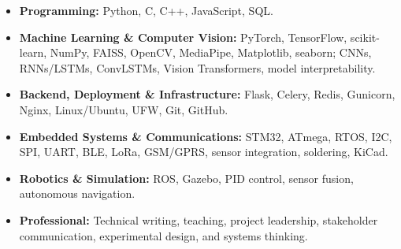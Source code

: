 \begin{itemize}
    \item \textbf{Programming:} Python, C, C++, JavaScript, SQL.
    \item \textbf{Machine Learning \& Computer Vision:} PyTorch, TensorFlow, scikit-learn, NumPy, FAISS, OpenCV, MediaPipe, Matplotlib, seaborn; CNNs, RNNs/LSTMs, ConvLSTMs, Vision Transformers, model interpretability.
    \item \textbf{Backend, Deployment \& Infrastructure:} Flask, Celery, Redis, Gunicorn, Nginx, Linux/Ubuntu, UFW, Git, GitHub.
    \item \textbf{Embedded Systems \& Communications:} STM32, ATmega, RTOS, I2C, SPI, UART, BLE, LoRa, GSM/GPRS, sensor integration, soldering, KiCad.
    \item \textbf{Robotics \& Simulation:} ROS, Gazebo, PID control, sensor fusion, autonomous navigation.
    \item \textbf{Professional:} Technical writing, teaching, project leadership, stakeholder communication, experimental design, and systems thinking.
\end{itemize}
